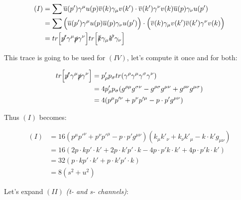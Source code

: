 \documentclass[11pt]{article}
\begin{document}
\begin{equation}
  \begin{split}
    (I) & = \sum \overline{u}(p') \gamma^\mu u(p) \overline{v}(k) \gamma_\mu v(k')
      \cdot \overline{v}(k') \gamma^\nu v(k) \overline{u}(p) \gamma_\nu u(p') \\
    & = \sum \Big ( \overline{u}(p') \gamma^\mu u(p)
                            \overline{u}(p) \gamma_\nu u(p') \Big )
      \cdot \Big ( \overline{v}(k) \gamma_\mu v(k')
                         \overline{v}(k') \gamma^\nu v(k) \Big ) \\
    & = tr \Big [ \slashed{p'} \gamma^\mu \slashed{p} \gamma^\nu \Big ]
      tr \Big [ \slashed{k} \gamma_\mu \slashed{k'} \gamma_\nu \Big ]
  \end{split}
\end{equation}

This trace is going to be used for $(IV)$, let's compute it once and for both:

\begin{equation}
  \begin{split}
    tr \Big [ \slashed{p'} \gamma^\mu \slashed{p} \gamma^\nu \Big ] & =
      p'_\rho p_\sigma tr ( \gamma^\rho \gamma^\mu \gamma^\sigma \gamma^\nu ) \\
    & = 4 p'_\rho p_\sigma ( g^{\rho \mu} g^{\sigma \nu} -
                                          g^{\rho \sigma} g^{\mu \nu} +
                                          g^{\rho \nu} g^{\mu \sigma}) \\
    & = 4 (p^\mu p'^\nu + p^\nu p'^\mu - p \cdot p' g^{\mu \nu})
  \end{split}
\end{equation}

Thus $(I)$ becomes:

\begin{equation}
  \begin{split}
    (I) & = 16 (p^\mu p'^\nu + p^\nu p'^\mu - p \cdot p' g^{\mu \nu})
                   (k_\mu k'_\nu + k_\nu k'_\mu - k \cdot k' g_{\mu \nu}) \\
    & = 16 ( 2 p \cdot k p' \cdot k' + 2 p \cdot k' p' \cdot k -
                  4 p \cdot p' k \cdot k' + 4 p \cdot p' k \cdot k' ) \\
    & = 32 ( p \cdot k p' \cdot k' + p \cdot k' p' \cdot k ) \\
    & = 8 ( s^2 + u^2 )
  \end{split}
\end{equation}

Let's expand $(II)$ \textit{(t- and s- channels)}:
\end{document}
